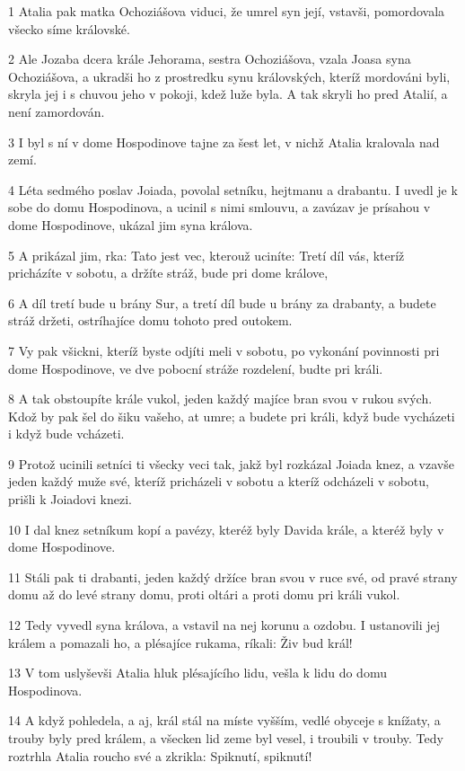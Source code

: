 \par 1 Atalia pak matka Ochoziášova viduci, že umrel syn její, vstavši, pomordovala všecko síme královské.
\par 2 Ale Jozaba dcera krále Jehorama, sestra Ochoziášova, vzala Joasa syna Ochoziášova, a ukradši ho z prostredku synu královských, kteríž mordováni byli, skryla jej i s chuvou jeho v pokoji, kdež luže byla. A tak skryli ho pred Atalií, a není zamordován.
\par 3 I byl s ní v dome Hospodinove tajne za šest let, v nichž Atalia kralovala nad zemí.
\par 4 Léta sedmého poslav Joiada, povolal setníku, hejtmanu a drabantu. I uvedl je k sobe do domu Hospodinova, a ucinil s nimi smlouvu, a zavázav je prísahou v dome Hospodinove, ukázal jim syna králova.
\par 5 A prikázal jim, rka: Tato jest vec, kterouž uciníte: Tretí díl vás, kteríž pricházíte v sobotu, a držíte stráž, bude pri dome králove,
\par 6 A díl tretí bude u brány Sur, a tretí díl bude u brány za drabanty, a budete stráž držeti, ostríhajíce domu tohoto pred outokem.
\par 7 Vy pak všickni, kteríž byste odjíti meli v sobotu, po vykonání povinnosti pri dome Hospodinove, ve dve pobocní stráže rozdelení, budte pri králi.
\par 8 A tak obstoupíte krále vukol, jeden každý majíce bran svou v rukou svých. Kdož by pak šel do šiku vašeho, at umre; a budete pri králi, když bude vycházeti i když bude vcházeti.
\par 9 Protož ucinili setníci ti všecky veci tak, jakž byl rozkázal Joiada knez, a vzavše jeden každý muže své, kteríž pricházeli v sobotu a kteríž odcházeli v sobotu, prišli k Joiadovi knezi.
\par 10 I dal knez setníkum kopí a pavézy, kteréž byly Davida krále, a kteréž byly v dome Hospodinove.
\par 11 Stáli pak ti drabanti, jeden každý držíce bran svou v ruce své, od pravé strany domu až do levé strany domu, proti oltári a proti domu pri králi vukol.
\par 12 Tedy vyvedl syna králova, a vstavil na nej korunu a ozdobu. I ustanovili jej králem a pomazali ho, a plésajíce rukama, ríkali: Živ bud král!
\par 13 V tom uslyševši Atalia hluk plésajícího lidu, vešla k lidu do domu Hospodinova.
\par 14 A když pohledela, a aj, král stál na míste vyšším, vedlé obyceje s knížaty, a trouby byly pred králem, a všecken lid zeme byl vesel, i troubili v trouby. Tedy roztrhla Atalia roucho své a zkrikla: Spiknutí, spiknutí!
